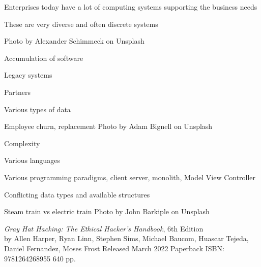 \documentclass[Screen16to9,17pt]{foils}
\begin{document}



\begin{list2}
\item Enterprises today have a lot of computing systems supporting the business needs
\item These are very diverse and often discrete systems
\end{list2}

\hfill Photo by Alexander Schimmeck on Unsplash



\begin{list2}
\item Accumulation of software
\item Legacy systems
\item Partners
\item Various types of data
\item Employee churn, replacement \hfill Photo by Adam Bignell on Unsplash
\end{list2}




\begin{list2}
\item Complexity
\item Various languages
\item Various programming paradigms, client server, monolith, Model View Controller
\item Conflicting data types and available structures
\item Steam train vs electric train \hfill Photo by John Barkiple on Unsplash

\end{list2}




\emph{Gray Hat Hacking: The Ethical Hacker's Handbook}, 6th Edition\\
by Allen Harper, Ryan Linn, Stephen Sims, Michael Baucom, Huascar Tejeda, Daniel Fernandez, Moses Frost
Released March 2022 Paperback ISBN: 9781264268955 640 pp.
\end{document}
